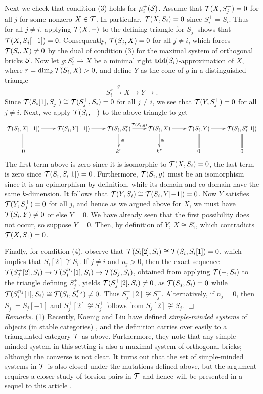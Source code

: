 \documentclass{amsart}
\begin{document}
Next we check that condition (3) holds for $\mu^+_i(\mathcal{S})$.  Assume that $\mathcal{T}(X,S^+_j) = 0$ for all $j$ for some nonzero $X \in \mathcal{T}$.  In particular, $\mathcal{T}(X,S_i) =0$ since $S^+_i = S_i$.  Thus for all $j \neq i$, applying $\mathcal{T}(X,-)$ to the defining triangle for $S^+_j$ shows that $\mathcal{T}(X,S_j[-1]) = 0$.  Consequently, $\mathcal{T}(S_j, X) = 0$ for all $j \neq i$, which forces $\mathcal{T}(S_i,X) \neq 0$ by the dual of condition (3) for the maximal system of orthogonal bricks $\mathcal{S}$.  Now let $g: S_i^{r} \rightarrow X$ be a minimal right $\mathrm{add}(S_i)$-approximation of $X$, where $r = \dim_k \mathcal{T}(S_i,X)>0$, and define $Y$ as the cone of $g$ in a distinguished triangle $$S_i^r \stackrel{g}{\longrightarrow} X \longrightarrow Y \rightarrow.$$
Since $\mathcal{T}(S_i[1],S^+_j) \cong \mathcal{T}(S^+_j, S_i) = 0$ for all $j \neq i$, we see that $\mathcal{T}(Y,S^+_j) = 0$ for all $j \neq i$.  Next, we apply $\mathcal{T}(S_i,-)$ to the above triangle to get 
$$\xymatrix{\T(S_i,X[-1]) \ar[r] \ar@{=}[d] &  \T(S_i, Y[-1]) \ar[r]  & \T(S_i,S_i^{r}) \ar[r]^{\T(S_i,g)} \ar[d]^{\cong} & \T(S_i, X) \ar[d]^{\cong} \ar[r] & \T(S_i,Y) \ar@{=}[d] \ar[r]& \T(S_i, S_i^r[1]) \ar@{=}[d] \\ 0&  & k^r &  k^r & 0 & 0 }$$
The first term above is zero since it is isomorphic to $\mathcal{T}(X,S_i)=0$, the last term is zero since $\mathcal{T}(S_i,S_i[1])=0$.  Furthermore, $\mathcal{T}(S_i,g)$ must be an isomorphism since it is an epimorphism by definition, while its domain and co-domain have the same $k$-dimension.  It follows that $\mathcal{T}(Y,S_i) \cong \mathcal{T}(S_i,Y[-1]) = 0$.  Now $Y$ satisfies $\mathcal{T}(Y,S^+_j) = 0$ for all $j$, and hence as we argued above for $X$, we must have $\mathcal{T}(S_i,Y) \neq 0$ or else $Y=0$.   We have already seen that the first possibility does not occur, so suppose $Y=0$.  Then, by definition of $Y$, $X \cong S_1^r$, which contradicts $\mathcal{T}(X,S_1)=0$.  

Finally, for condition (4), observe that $\mathcal{T}(S_i[2],S_i) \cong \mathcal{T}(S_i,S_i[1])=0$, which implies that $S_i[2] \not \cong S_i$.  If $j \neq i$ and $n_j >0$, then the exact sequence $\mathcal{T}(S^+_j[2],S_i) \rightarrow \mathcal{T}( S_i^{n_j}[1],S_i) \rightarrow \mathcal{T}(S_j,S_i)$, obtained from applying $\mathcal{T}(-,S_i)$ to the triangle defining $S^+_j$, yields $\mathcal{T}(S^+_j[2],S_i) \neq 0$, as $\mathcal{T}(S_j,S_i) = 0$ while $\mathcal{T}(S_i^{n_j}[1],S_i) \cong \mathcal{T}(S_i,S_i^{n_j}) \neq 0$.  Thus $S^+_j[2] \not \cong S^+_j$.  Alternatively, if $n_j=0$, then $S^+_j = S_j[-1]$ and $S^+_j[2] \not \cong S^+_j$ follows from $S_j[2] \not \cong S_j$.  $\Box$ \\

\noindent
{\it Remarks.}  (1) Recently, Koenig and Liu have defined {\it simple-minded systems} of objects (in stable categories) \cite{KoeLiu}, and the definition carries over easily to a triangulated category $\mathcal{T}$ as above.  Furthermore, they note that any simple minded system in this setting is also a maximal system of orthogonal bricks; although the converse is not clear.  It turns out that the set of simple-minded systems in $\mathcal{T}$ is also closed under the mutations defined above, but the argument requires a closer study of torsion pairs in $\mathcal{T}$ and hence will be presented in a sequel to this article \cite{SMS}.
\end{document}
